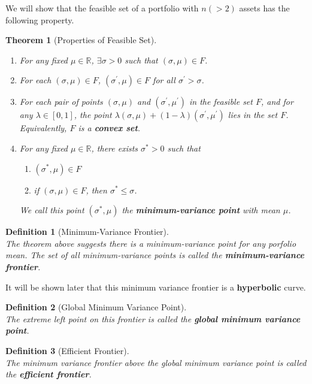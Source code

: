 \documentclass[12pt]{article}
\newtheorem{definition}{Definition}[section]
\newtheorem{theorem}{Theorem}[section]
\theoremstyle{definition}
\begin{document}
We will show that the feasible set of a portfolio with $n(>2)$ assets has the following property.
\begin{theorem}[Properties of Feasible Set]
\hfill\\\normalfont \begin{enumerate}
\item For any fixed $\mu\in\mathbb{R}$, $\exists \sigma>0$ such that $(\sigma,\mu)\in F$.
\item For each $(\sigma,\mu)\in F$, $(\sigma^\prime, \mu)\in F$ for all $\sigma^\prime>\sigma$.
\item For each pair of points $(\sigma, \mu)$ and $(\sigma^\prime, \mu^\prime)$ in the feasible set $F$, and for any $\lambda\in[0,1]$, the point $\lambda(\sigma,\mu)+(1-\lambda)(\sigma^\prime,\mu^\prime)$ lies in the set $F$. \\Equivalently, $F$ is a \textbf{convex set}.
\item For any fixed $\mu\in \mathbb{R}$, there exists $\sigma^\ast>0$ such that
\begin{enumerate}
\item $(\sigma^\ast,\mu)\in F$
\item if $(\sigma,\mu)\in F$, then $\sigma^\ast\leq \sigma$.
\end{enumerate}
We call this point $(\sigma^\ast, \mu)$ the \textbf{minimum-variance point} with mean $\mu$.
\end{enumerate}
\end{theorem}
\begin{definition}[Minimum-Variance Frontier]
\hfill\\\normalfont The theorem above suggests there is a minimum-variance point for any porfolio mean. The set of all minimum-variance points is called the \textbf{minimum-variance frontier}.
\end{definition}
It will be shown later that this minimum variance frontier is a \textbf{hyperbolic} curve.
\begin{definition}[Global Minimum Variance Point]
\hfill\\\normalfont The extreme left point on this frontier is called the \textbf{global minimum variance point}.
\end{definition}
\begin{definition}[Efficient Frontier]
\hfill\\\normalfont The minimum variance frontier \textit{above} the global minimum variance point is called the \textbf{efficient frontier}.
\end{definition}
\clearpage 
\end{document}
